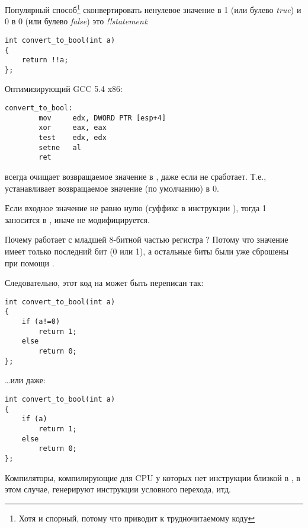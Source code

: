 
Популярный способ\footnote{Хотя и спорный, потому что приводит к трудночитаемому коду} сконвертировать ненулевое значение
в 1 (или булево \emph{true}) и 0 в 0 (или булево \emph{false}) это \emph{!!statement}:

\begin{lstlisting}[style=customc]
int convert_to_bool(int a)
{
	return !!a;
};
\end{lstlisting}

Оптимизирующий GCC 5.4 x86:

\begin{lstlisting}[style=customasmx86]
convert_to_bool:
        mov     edx, DWORD PTR [esp+4]
        xor     eax, eax
        test    edx, edx
        setne   al
        ret
\end{lstlisting}

 всегда очищает возвращаемое значение в \EAX, даже если  не сработает.
Т.е.,  устанавливает возвращаемое значение (по умолчанию) в 0.

Если входное значение не равно нулю (суффикс  в инструкции ),
тогда 1 заносится в \AL, иначе \AL не модифицируется.

Почему  работает с младшей 8-битной частью регистра \EAX{}?
Потому что значение имеет только последний бит (0 или 1), а остальные биты были уже сброшены при помощи .

Следовательно, этот код на \CCpp может быть переписан так:

\begin{lstlisting}[style=customc]
int convert_to_bool(int a)
{
	if (a!=0)
		return 1;
	else
		return 0;
};
\end{lstlisting}

\dots или даже:

\begin{lstlisting}[style=customc]
int convert_to_bool(int a)
{
	if (a)
		return 1;
	else
		return 0;
};
\end{lstlisting}

Компиляторы, компилирующие для \ac{CPU} у которых нет инструкции близкой в
, в этом случае, генерируют инструкции условного перехода, итд.

